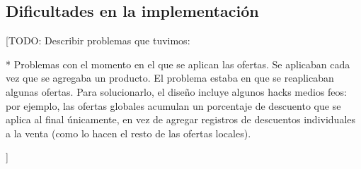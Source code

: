 \documentclass[a4paper,11pt]{article}
\begin{document}
\subsection{Dificultades en la implementación}

[TODO: Describir problemas que tuvimos:

  * Problemas con el momento en el que se aplican las ofertas. Se aplicaban
  cada vez que se agregaba un producto. El problema estaba en que se
  reaplicaban algunas ofertas. Para solucionarlo, el diseño incluye algunos
  hacks medios feos: por ejemplo, las ofertas globales acumulan un porcentaje
  de descuento que se aplica al final únicamente, en vez de agregar registros
  de descuentos individuales a la venta (como lo hacen el resto de las ofertas
  locales).

]
\end{document}
